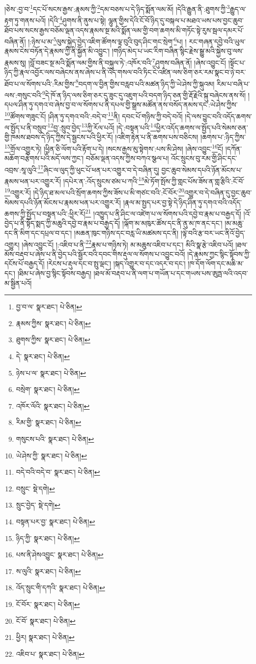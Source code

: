 །ཅེས་:བྱ་བ་\footnote{བྱ་བ་ལ་  སྣར་ཐང་།  པེ་ཅིན། }དང་པོ་སངས་རྒྱས་:རྣམས་ཀྱི་\footnote{རྣམས་ཀྱིས་  སྣར་ཐང་།  པེ་ཅིན། }དམ་བཅས་པ་དེ་ཉིད་སྨོན་ལམ་མོ། །དེའི་རྒྱུན་ནི་:ཐུགས་ཀྱི་\footnote{ཐུགས་ཀྱིས་  སྣར་ཐང་།  པེ་ཅིན། }རྒྱུད་ལ་རྟག་ཏུ་གནས་པའོ། །དེའི་\footnote{དེ་  སྣར་ཐང་།  པེ་ཅིན། }ཤུགས་ནི་ནུས་པ་སྟེ། ལྷུན་གྱིས་དེའི་ངོ་བོ་ཉིད་དུ་བསྐལ་པ་མཐའ་ཡས་པས་བྱང་ཆུབ་ཐོབ་པས་སངས་རྒྱས་བཅོམ་ལྡན་འདས་རྣམས་སྔ་མའི་སྨོན་ལམ་གྱི་བག་ཆགས་མི་གཏོང་སྟེ་རུས་སྦལ་དམར་པོ་བཞིན་ནོ། །:ཉེས་པ་མ་\footnote{ཉེས་པ་ལ་  སྣར་ཐང་།  པེ་ཅིན། }ལུས་སྐྱེད་བྱེད་འཇིག་ཚོགས་ལྟ་བུའི་བུད་ཤིང་གང་སྲེག་\footnote{བསྲེག་  སྣར་ཐང་།  པེ་ཅིན། }པ། །
རང་གཞན་དབྱེ་བའི་ཡུལ་རྣམས་ངེས་བཏོན་དེ་རྣམས་ཀྱི་ནི་སྐྱོན་མི་འབྱུང་། །གཉིད་མེད་པ་ཡང་རིག་བཞིན་སྙིང་རྗེས་སྒྱུ་མའི་སྐྱེས་བུ་ལས་རྣམས་སུ། །བློ་བཟང་སྔ་མའི་སྨོན་ལམ་གྱིས་ནི་བསྐུལ་ཏེ་:འཁོར་བའི་\footnote{འཁོར་ལོའི་  སྣར་ཐང་།  པེ་ཅིན། }ཤུགས་བཞིན་ནོ། །ཞེས་འབྱུང་ངོ། །སྟོང་པ་ཉིད་ཀྱི་རྣལ་འབྱོར་ལས་བཞེངས་ནས་ཞེས་པ་ནི་འོད་གསལ་བའི་ཏིང་ངེ་འཛིན་ལས་ཅིག་ཅར་རམ་སྣང་བ་ཉེ་བར་ཐོབ་པ་ལ་སོགས་པའི་:རིམ་གྱིས་\footnote{རིམ་གྱི་  སྣར་ཐང་།  པེ་ཅིན། }བདག་ལ་བྱིན་གྱིས་བརླབ་པའི་མཚན་ཉིད་ཀྱི་ཡེ་ཤེས་ཀྱི་སྐུའམ། རིམ་པ་བཞི་པ་ལས་:གསུང་བའི་\footnote{གསུངས་པའི་  སྣར་ཐང་།  པེ་ཅིན། }དེ་ཁོ་ན་ཉིད་ལས་ཅིག་ཅར་དུ་ཟུང་དུ་འཇུག་པའི་བདག་ཉིད་ཅན་གྱི་རྡོ་རྗེའི་སྐུ་བཞེངས་ནས་སོ། །དཔལ་ཤིན་ཏུ་དགའ་བ་ཞེས་བྱ་བ་ལ་སོགས་པ་ནི་དཔལ་གྱི་སྒྲས་མཚོན་ནས་བསོད་ནམས་དང་:ཡེ་ཤེས་ཀྱིས་\footnote{ཡེ་ཤེས་ཀྱི་  སྣར་ཐང་།  པེ་ཅིན། }ཚོགས་གཟུང་ངོ། །ཤིན་ཏུ་དགའ་བའི་:བདེ་བ་\footnote{བདེ་བའི་བདེ་བ་  སྣར་ཐང་།  པེ་ཅིན། }ནི། དབང་པོ་གཉིས་ཀྱི་བདེ་བའོ། །དེ་ལས་བྱུང་བའི་འདོད་ཆགས་ལ་སྤྱོད་པ་ནི་བསྲུབ་\footnote{བསྲུང་  སྡེ་དགེ། }བྱ་:སྲུབ་བྱེད་\footnote{སྲུང་བྱེད་  སྡེ་དགེ། }ཀྱི་རོལ་པའོ། །དེ་:བསྟན་པའི་\footnote{བསྟན་པར་བྱ་  སྣར་ཐང་།  པེ་ཅིན། }ཕྱིར་འདོད་ཆགས་ལ་སྤྱོད་པའི་སེམས་ཅན་གྱི་ཁམས་ཐབས་དེ་ཉིད་ཀྱིས་དེ་སྦྱངས་པའི་ཕྱིར་རོ། །འཇིག་རྟེན་པ་ནི་ཆགས་པས་བཅིངས། །ཆགས་པ་:ཉིད་ཀྱིས་\footnote{ཉིད་ཀྱི་  སྣར་ཐང་།  པེ་ཅིན། }གྲོལ་འགྱུར་ཏེ། །ཕྱིན་ཅི་ལོག་པའི་རྟོག་པ་དེ། །སངས་རྒྱས་མུ་སྟེགས་:པས་མི་ཤེས། །ཞེས་འབྱུང་\footnote{པས་ནི་ཤེསའབྱུང་  སྣར་ཐང་།  པེ་ཅིན། }ངོ། །དཀོན་མཆོག་བརྩེགས་པའི་མདོ་ལས་ཀྱང་། བཅོམ་ལྡན་འདས་ཀྱིས་བཀའ་སྩལ་པ། འོང་སྲུངས་བུ་རམ་གྱི་ཤིང་དང་འབྲས་:སཱ་ལུའི་\footnote{ས་ལུའི་  སྣར་ཐང་།  པེ་ཅིན། }ཞིང་ལ་ལུད་ཀྱི་ཕུང་པོ་ཕན་པར་འགྱུར་བ་དེ་བཞིན་དུ། བྱང་ཆུབ་སེམས་དཔའི་ཉོན་མོངས་པ་རྣམས་ཕན་པར་འགྱུར་རོ། །དཔེར་ན་:འོད་སྲུངས་ཙམ་པ་ཀའི་\footnote{འོད་སྲུང་གི་དཀའི་  སྣར་ཐང་།  པེ་ཅིན། }མེ་ཏོག་སྤོས་ཀྱི་གླང་པོས་ཟོས་ན་གླ་རྩིའི་:ངོ་བོ་\footnote{ངོ་བོར་  སྣར་ཐང་།  པེ་ཅིན། }འགྱུར་རོ། །དེ་ཉིད་ཐ་མལ་པའི་སྲོག་ཆགས་ཀྱིས་ཟོས་པ་མི་གཙང་བའི་:ངོ་བོར་\footnote{ངོ་བོ་  སྣར་ཐང་།  པེ་ཅིན། }འགྱུར་བ་དེ་བཞིན་དུ་བྱང་ཆུབ་སེམས་དཔའི་ཉོན་མོངས་པ་རྣམས་ཕན་པར་འགྱུར་རོ། །རྣལ་མ་སྤྱད་པར་བྱ་སྟེ་དེ་ཉིད་ཤིན་ཏུ་དགའ་བའི་འདོད་ཆགས་ཀྱི་སྤྱོད་པ་བསྟན་པའི་:ཕྱིར་རོ།\footnote{ཕྱིར།  སྣར་ཐང་།  པེ་ཅིན། } །འཁྱུད་པ་ནི་ཤིང་ལ་འཛེག་པ་ལ་སོགས་པའི་དབྱེ་བ་རྣམ་པ་བརྒྱད་དོ། །འོ་བྱེད་པ་ནི་སྟོད་སྨད་ཀྱི་མཆུའི་དབྱེ་བ་རྣམ་པ་བརྒྱད་དོ། །ལྐོག་མ་མཁུར་ཚོས་དང་ནི་ནུ་མ་ཁ་ནང་དང་། །མ་མཆུ་དང་ནི་མིག་དང་དཔྲལ་བ་དང་། །མཆན་ཁུང་གཉིས་དང་བརླ་ཡི་མཚམས་དང་ནི། །ལྟེ་བའི་རྩ་བར་ཡང་ནིའོ་བྱེད་འགྱུར། །ཞེས་འབྱུང་ངོ། །:འཇིབ་པ་ནི་\footnote{འཇིབ་པ་  སྣར་ཐང་།  པེ་ཅིན། }རྣམ་པ་གཉིས་ཏེ། མ་མཆུས་འཇིབ་པ་དང་། མིའི་སྣ་རྩེ་འཇིབ་པའོ། །ཐལ་མོས་བརྡབ་པ་ཞེས་པ་ནི་བྱེད་པའི་སྦྱོར་བའི་དབང་གིས་རྡུལ་ལ་སོགས་པ་འབྱུང་བའོ། །དེ་རྣམས་ཀྱང་སྙིང་སྟོབས་ཀྱི་དངོས་པོ་བརྒྱད་དོ། །རེངས་པ་རྡུལ་དང་བ་སྤུ་ལྡང་། །སྐད་འགྱུར་བ་དང་འདར་བ་དང་། །ཁ་དོག་ལོག་དང་མཆི་མ་དང་། །ཐིམ་པ་ཞེས་བྱ་སྙིང་སྟོབས་བརྒྱད། །ཐལ་མོ་བརྡབ་པ་ནི་ལག་པ་གཡོན་པ་དང་གཡས་པས་ཨུཏྤ་ལའི་འདབ་མ་སྦྱིན་པའོ། 